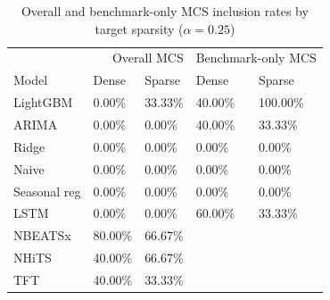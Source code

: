 \begin{table}
\caption{Overall and benchmark-only MCS inclusion rates by target sparsity ($\alpha=0.25$)}
\begin{tabular}{lllll}
\toprule
 & \multicolumn{2}{r}{Overall MCS} & \multicolumn{2}{r}{Benchmark-only MCS} \\
Model & Dense & Sparse & Dense & Sparse \\
\midrule
LightGBM & 0.00\% & 33.33\% & 40.00\% & 100.00\% \\
ARIMA & 0.00\% & 0.00\% & 40.00\% & 33.33\% \\
Ridge & 0.00\% & 0.00\% & 0.00\% & 0.00\% \\
Naive & 0.00\% & 0.00\% & 0.00\% & 0.00\% \\
Seasonal reg & 0.00\% & 0.00\% & 0.00\% & 0.00\% \\
LSTM & 0.00\% & 0.00\% & 60.00\% & 33.33\% \\
NBEATSx & 80.00\% & 66.67\% &  &  \\
NHiTS & 40.00\% & 66.67\% &  &  \\
TFT & 40.00\% & 33.33\% &  &  \\
\bottomrule
\end{tabular}
\end{table}
